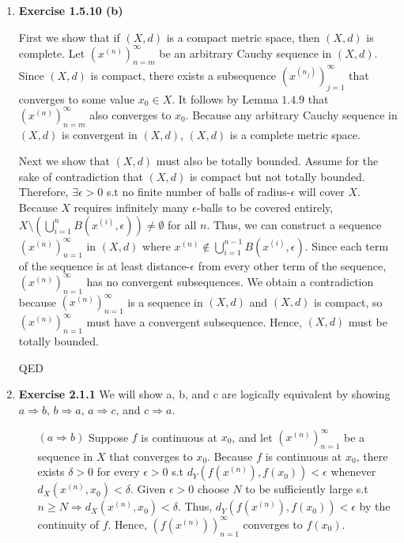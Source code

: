 \documentclass[10pt]{article}
\begin{document}
\begin{enumerate}[label=Problem \arabic*.]
    \item \textbf{Exercise 1.5.10 (b)}\par 
    First we show that if $(X,d)$ is a compact metric space, then $(X,d)$ is complete. 
    Let $(x^{(n)})_{n=m}^{\infty}$ be an arbitrary Cauchy sequence in $(X,d)$. Since $(X,d)$ is compact, there exists a subsequence $(x^{(n_j)})_{j=1}^{\infty}$ that converges to some value $x_0\in X$. 
    It follows by Lemma $1.4.9$ that $(x^{(n)})_{n=m}^{\infty}$ also converges to $x_0$. 
    Because any arbitrary Cauchy sequence in $(X,d)$ is convergent in $(X,d)$, $(X,d)$ is a complete metric space.\par 
    Next we show that $(X,d)$ must also be totally bounded. 
    Assume for the sake of contradiction that $(X,d)$ is compact but not totally bounded. 
    Therefore, $\exists\epsilon>0$ s.t no finite number of balls of radius-$\epsilon$ will cover $X$.
    Because $X$ requires infinitely many $\epsilon$-balls to be covered entirely, $X\setminus(\displaystyle{\bigcup_{i=1}^{n}}B(x^{(i)},\epsilon))\neq \emptyset$ for all $n$. 
    Thus, we can construct a sequence $(x^{(n)})_{n=1}^{\infty}$ in $(X,d)$ where $x^{(n)} \notin \displaystyle{\bigcup_{i=1}^{n-1}}B(x^{(i)},\epsilon)$.
    Since each term of the sequence is at least distance-$\epsilon$ from every other term of the sequence, $(x^{(n)})_{n=1}^{\infty}$ has no convergent subsequences. 
    We obtain a contradiction because $(x^{(n)})_{n=1}^{\infty}$ is a sequence in $(X,d)$ and $(X,d)$ is compact, so $(x^{(n)})_{n=1}^{\infty}$ must have a convergent subsequence.
    Hence, $(X,d)$ must be totally bounded.\par 
    QED
    \item \textbf{Exercise 2.1.1}
    We will show a, b, and c are logically equivalent by showing $a\Rightarrow b$, $b \Rightarrow a$, $a\Rightarrow c$, and $c\Rightarrow a$.
    \begin{itemize}
        \item [$(a\Rightarrow b)$] Suppose $f$ is continuous at $x_0$, and let $(x^{(n)})_{n=1}^{\infty}$ be a sequence in $X$ that converges to $x_0$. 
        Because $f$ is continuous at $x_0$, there exists $\delta>0$ for every $\epsilon>0$ s.t $d_Y(f(x^{(n)}),f(x_0))<\epsilon$ whenever $d_X(x^{(n)},x_0)<\delta$.
        Given $\epsilon>0$ choose $N$ to be sufficiently large s.t $n\ge N\Rightarrow d_X(x^{(n)},x_0)<\delta$.
        Thus, $d_Y(f(x^{(n)}),f(x_0))<\epsilon$ by the continuity of $f$.
        Hence, $(f(x^{(n)}))_{n=1}^{\infty}$ converges to $f(x_0)$.
       

\end{itemize}
\end{enumerate}
\end{document}

